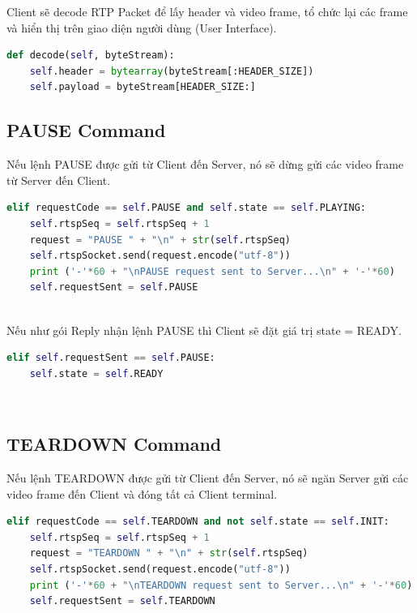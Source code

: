 \documentclass[a4paper]{article}
\begin{document}
Client sẽ decode RTP Packet để lấy header và video frame, tổ chức lại các frame và hiển thị trên giao diện người dùng (User Interface).

\begin{lstlisting}[language=Python]
def decode(self, byteStream):
    self.header = bytearray(byteStream[:HEADER_SIZE])
    self.payload = byteStream[HEADER_SIZE:]
\end{lstlisting}

\subsection{PAUSE Command}

\noindent Nếu lệnh PAUSE được gửi từ Client đến Server, nó sẽ dừng gửi các video frame từ Server đến Client.

\begin{lstlisting}[language=Python]
elif requestCode == self.PAUSE and self.state == self.PLAYING:
    self.rtspSeq = self.rtspSeq + 1
    request = "PAUSE " + "\n" + str(self.rtspSeq)
    self.rtspSocket.send(request.encode("utf-8"))
    print ('-'*60 + "\nPAUSE request sent to Server...\n" + '-'*60)
    self.requestSent = self.PAUSE
\end{lstlisting}
\\

\noindent Nếu như gói Reply nhận lệnh PAUSE thì Client sẽ đặt giá trị state = READY.

\begin{lstlisting}[language=Python]
elif self.requestSent == self.PAUSE:
    self.state = self.READY
\end{lstlisting}
\\

\subsection{TEARDOWN Command}

Nếu lệnh TEARDOWN được gửi từ Client đến Server, nó sẽ ngăn Server gửi các video frame đến Client và đóng tất cả Client terminal.

\begin{lstlisting}[language=Python]
elif requestCode == self.TEARDOWN and not self.state == self.INIT:
    self.rtspSeq = self.rtspSeq + 1
    request = "TEARDOWN " + "\n" + str(self.rtspSeq)
    self.rtspSocket.send(request.encode("utf-8"))
    print ('-'*60 + "\nTEARDOWN request sent to Server...\n" + '-'*60)
    self.requestSent = self.TEARDOWN
\end{lstlisting}
\\
\end{document}
